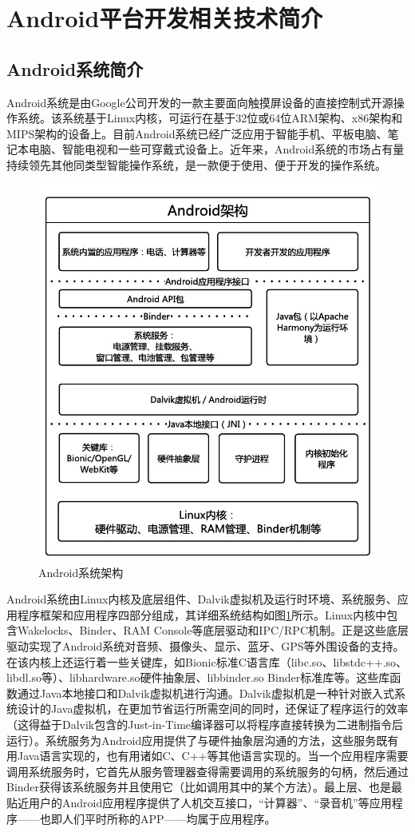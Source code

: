 \setcounter{figure}{0}
\setcounter{table}{0}
\section{Android平台开发相关技术简介}

\subsection{Android系统简介}
Android系统是由Google公司开发的一款主要面向触摸屏设备的直接控制式开源操作系统。该系统基于Linux内核，可运行在基于32位或64位ARM架构、x86架构和MIPS架构的设备上。目前Android系统已经广泛应用于智能手机、平板电脑、笔记本电脑、智能电视和一些可穿戴式设备上。近年来，Android系统的市场占有量持续领先其他同类型智能操作系统，是一款便于使用、便于开发的操作系统。
\begin{figure}[htbp]
 \centering
        \includegraphics[width=0.5\columnwidth]{fig2-1.png}
        \caption{
                \label{fig2-1}
                Android系统架构
        }
\end{figure}

Android系统由Linux内核及底层组件、Dalvik虚拟机及运行时环境、系统服务、应用程序框架和应用程序四部分组成，其详细系统结构如图\ref{fig2-1}所示。Linux内核中包含Wakelocks、Binder、RAM Console等底层驱动和IPC/RPC机制。正是这些底层驱动实现了Android系统对音频、摄像头、显示、蓝牙、GPS等外围设备的支持。在该内核上还运行着一些关键库，如Bionic标准C语言库（libc.so、libstdc++.so、libdl.so等）、libhardware.so硬件抽象层、libbinder.so Binder标准库等。这些库函数通过Java本地接口和Dalvik虚拟机进行沟通。Dalvik虚拟机是一种针对嵌入式系统设计的Java虚拟机，在更加节省运行所需空间的同时，还保证了程序运行的效率（这得益于Dalvik包含的Just-in-Time编译器可以将程序直接转换为二进制指令后运行）\cite{yaghmour_embedded_2013}。系统服务为Android应用提供了与硬件抽象层沟通的方法，这些服务既有用Java语言实现的，也有用诸如C、C++等其他语言实现的。当一个应用程序需要调用系统服务时，它首先从服务管理器查得需要调用的系统服务的句柄，然后通过Binder获得该系统服务并且使用它（比如调用其中的某个方法）。最上层、也是最贴近用户的Android应用程序提供了人机交互接口，“计算器”、“录音机”等应用程序——也即人们平时所称的APP——均属于应用程序。

